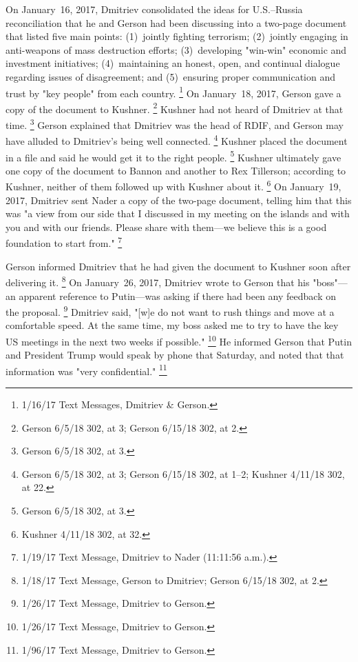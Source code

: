 On January~16, 2017, Dmitriev consolidated the ideas for U.S.--Russia reconciliation that he and Gerson had been discussing into a two-page document that listed five main points:
(1)~jointly fighting terrorism;
(2)~jointly engaging in anti-weapons of mass destruction efforts;
(3)~developing "win-win" economic and investment initiatives;
(4)~maintaining an honest, open, and continual dialogue regarding issues of disagreement; and
(5)~ensuring proper communication and trust by "key people" from each country.%
\footnote{1/16/17 Text Messages, Dmitriev \& Gerson.}
On January~18, 2017, Gerson gave a copy of the document to Kushner.%
\footnote{Gerson 6/5/18 302, at 3;
Gerson 6/15/18 302, at 2.}
Kushner had not heard of Dmitriev at that time.%
\footnote{Gerson 6/5/18 302, at 3.}
Gerson explained that Dmitriev was the head of RDIF, and Gerson may have alluded to Dmitriev's being well connected.%
\footnote{Gerson 6/5/18 302, at 3;
Gerson 6/15/18 302, at 1--2;
Kushner 4/11/18 302, at 22.}
Kushner placed the document in a file and said he would get it to the right people.%
\footnote{Gerson 6/5/18 302, at 3.}
Kushner ultimately gave one copy of the document to Bannon and another to Rex Tillerson; according to Kushner, neither of them followed up with Kushner about it.%
\footnote{Kushner 4/11/18 302, at 32.}
On January~19, 2017, Dmitriev sent Nader a copy of the two-page document, telling him that this was "a view from our side that I discussed in my meeting on the islands and with you and with our friends.
Please share with them---we believe this is a good foundation to start from."%
\footnote{1/19/17 Text Message, Dmitriev to Nader (11:11:56 a.m.).}

Gerson informed Dmitriev that he had given the document to Kushner soon after delivering it.%
\footnote{1/18/17 Text Message, Gerson to Dmitriev;
Gerson 6/15/18 302, at 2.}
On January~26, 2017, Dmitriev wrote to Gerson that his "boss"---an apparent reference to Putin---was asking if there had been any feedback on the proposal.%
\footnote{1/26/17 Text Message, Dmitriev to Gerson.}
Dmitriev said, "[w]e do not want to rush things and move at a comfortable speed.
At the same time, my boss asked me to try to have the key US meetings in the next two weeks if possible."%
\footnote{1/26/17 Text Message, Dmitriev to Gerson.}
He informed Gerson that Putin and President Trump would speak by phone that Saturday, and noted that that information was "very confidential."%
\footnote{1/96/17 Text Message, Dmitriev to Gerson.}

